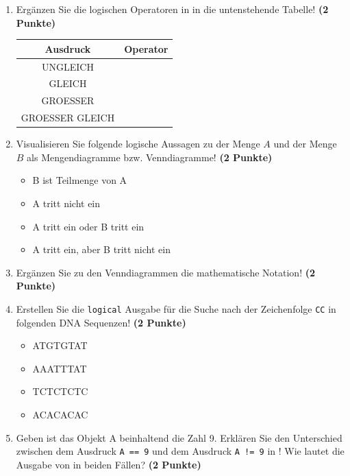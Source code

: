 \documentclass[a4paper, 9pt]{scrartcl}\usepackage[]{graphicx}\usepackage[]{xcolor}
\begin{document}
\vspace{1Ex}



\begin{enumerate}
\item Erg{\"a}nzen Sie die logischen Operatoren in \Rlogo in die untenstehende Tabelle!
  \textbf{(2 Punkte)}
  \begin{center}
    \begin{tabular}{c|c}
      \textbf{Ausdruck} & \textbf{Operator} \strut\\ \hline
      UNGLEICH  & \phantom{UNGLEICH}\strut\\ \hline
      GLEICH  & \phantom{GLEICH}\strut\\ \hline
      GROESSER  & \phantom{GROESSER}\strut\\ \hline
      GROESSER GLEICH  & \phantom{GROESSER GLEICH}\strut\\ 
    \end{tabular}
  \end{center}  
\item Visualisieren Sie folgende logische Aussagen zu der Menge $A$ und der Menge
  $B$ als Mengendiagramme bzw. Venndiagramme!
  \textbf{(2 Punkte)}
  \begin{itemize}
  \item B ist Teilmenge von A
  \item A tritt nicht ein
  \item A tritt ein oder B tritt ein
  \item A tritt ein, aber B tritt nicht ein
  \end{itemize}
\item Erg{\"a}nzen Sie zu den Venndiagrammen die mathematische Notation!
  \textbf{(2 Punkte)}
\item Erstellen Sie die \texttt{logical} \Rlogo Ausgabe f{\"u}r die
  Suche nach der Zeichenfolge \texttt{CC} in folgenden DNA
  Sequenzen! \textbf{(2 Punkte)}
  \begin{itemize}
  \item ATGTGTAT
  \item AAATTTAT
  \item TCTCTCTC
  \item ACACACAC
  \end{itemize}
\item Geben ist das \Rlogo Objekt A beinhaltend die Zahl
  9. Erkl{\"a}ren Sie den Unterschied zwischen dem Ausdruck \texttt{A == 9}
  und dem Ausdruck \texttt{A != 9} in \Rlogo! Wie lautet die Ausgabe von \Rlogo
  in beiden F{\"a}llen? \textbf{(2 Punkte)}
\end{enumerate}
\end{document}
